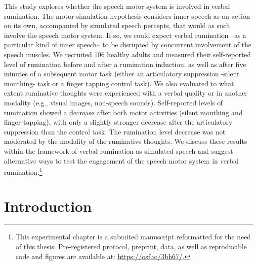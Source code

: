 \documentclass[a4paper,12pt,twoside,openright,oldfontcommands,final]{memoir}
\let\rmarkdownfootnote\footnote%
\def\footnote{\protect\rmarkdownfootnote}
\newcommand{\initial}[1]{
	\lettrine[lines=3,lhang=0.33,nindent=0em]{
		\color{gray}
     		{\textsc{#1}}}{}}
\begin{document}
\initial{T}his study explores whether the speech motor system is involved in verbal rumination. The motor simulation hypothesis considers inner speech as an action on its own, accompanied by simulated speech percepts, that would as such involve the speech motor system. If so, we could expect verbal rumination --as a particular kind of inner speech-- to be disrupted by concurrent involvement of the speech muscles. We recruited 106 healthy adults and measured their self-reported level of rumination before and after a rumination induction, as well as after five minutes of a subsequent motor task (either an articulatory suppression -silent mouthing- task or a finger tapping control task). We also evaluated to what extent ruminative thoughts were experienced with a verbal quality or in another modality (e.g., visual images, non-speech sounds). Self-reported levels of rumination showed a decrease after both motor activities (silent mouthing and finger-tapping), with only a slightly stronger decrease after the articulatory suppression than the control task. The rumination level decrease was not moderated by the modality of the ruminative thoughts. We discuss these results within the framework of verbal rumination as simulated speech and suggest alternative ways to test the engagement of the speech motor system in verbal rumination.\footnote{This experimental chapter is a submited manuscript reformatted for the need of this thesis. Pre-registered protocol, preprint, data, as well as reproducible code and figures are available at: \url{https://osf.io/3bh67/}.}

\hypertarget{introduction-3}{%
\section{Introduction}\label{introduction-3}}
\end{document}

